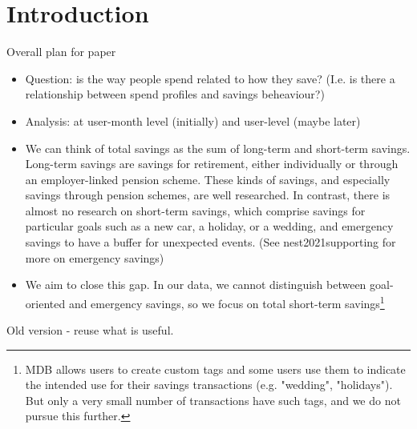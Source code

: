 
\section{Introduction}%
\label{sec:introduction}

Overall plan for paper
\begin{itemize}
    \item Question: is the way people spend related to how they save? (I.e. is
        there a relationship between spend profiles and savings beheaviour?)

    \item Analysis: at user-month level (initially) and user-level (maybe
        later)


\end{itemize}


\begin{itemize}

    \item We can think of total savings as the sum of long-term and short-term
        savings. Long-term savings are savings for retirement, either
        individually or through an employer-linked pension scheme. These kinds
        of savings, and especially savings through pension schemes, are well
        researched. In contrast, there is almost no research on short-term
        savings, which comprise savings for particular goals such as a new car,
        a holiday, or a wedding, and emergency savings to have a buffer for
        unexpected events. (See nest2021supporting for more on emergency
        savings)

    \item We aim to close this gap. In our data, we cannot distinguish between
        goal-oriented and emergency savings, so we focus on total short-term
        savings\footnote{MDB allows users to create custom tags and some users
            use them to indicate the intended use for their savings
            transactions (e.g. "wedding", "holidays"). But only a very small
        number of transactions have such tags, and we do not pursue this
    further.}

\end{itemize}

Old version - reuse what is useful.

